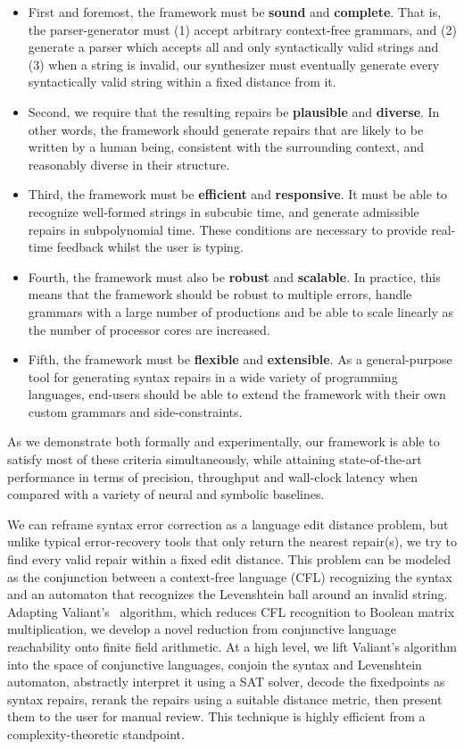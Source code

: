 \documentclass[sigplan,screen]{acmart}
\begin{document}
\begin{itemize}
  \item First and foremost, the framework must be \textbf{sound} and \textbf{complete}. That is, the parser-generator must (1) accept arbitrary context-free grammars, and (2) generate a parser which accepts all and only syntactically valid strings and (3) when a string is invalid, our synthesizer must eventually generate every syntactically valid string within a fixed distance from it.
  \item Second, we require that the resulting repairs be \textbf{plausible} and \textbf{diverse}. In other words, the framework should generate repairs that are likely to be written by a human being, consistent with the surrounding context, and reasonably diverse in their structure.
  \item Third, the framework must be \textbf{efficient} and \textbf{responsive}. It must be able to recognize well-formed strings in subcubic time, and generate admissible repairs in subpolynomial time. These conditions are necessary to provide real-time feedback whilst the user is typing.
  \item Fourth, the framework must also be \textbf{robust} and \textbf{scalable}. In practice, this means that the framework should be robust to multiple errors, handle grammars with a large number of productions and be able to scale linearly as the number of processor cores are increased.
  \item Fifth, the framework must be \textbf{flexible} and \textbf{extensible}. As a general-purpose tool for generating syntax repairs in a wide variety of programming languages, end-users should be able to extend the framework with their own custom grammars and side-constraints.
\end{itemize}

As we demonstrate both formally and experimentally, our framework is able to satisfy most of these criteria simultaneously, while attaining state-of-the-art performance in terms of precision, throughput and wall-clock latency when compared with a variety of neural and symbolic baselines.

We can reframe syntax error correction as a language edit distance problem, but unlike typical error-recovery tools that only return the nearest repair(s), we try to find every valid repair within a fixed edit distance. This problem can be modeled as the conjunction between a context-free language (CFL) recognizing the syntax and an automaton that recognizes the Levenshtein ball around an invalid string. Adapting Valiant's~\cite{valiant1975general} algorithm, which reduces CFL recognition to Boolean matrix multiplication, we develop a novel reduction from conjunctive language reachability onto finite field arithmetic. At a high level, we lift Valiant's algorithm into the space of conjunctive languages, conjoin the syntax and Levenshtein automaton, abstractly interpret it using a SAT solver, decode the fixedpoints as syntax repairs, rerank the repairs using a suitable distance metric, then present them to the user for manual review. This technique is highly efficient from a complexity-theoretic standpoint.
\end{document}
